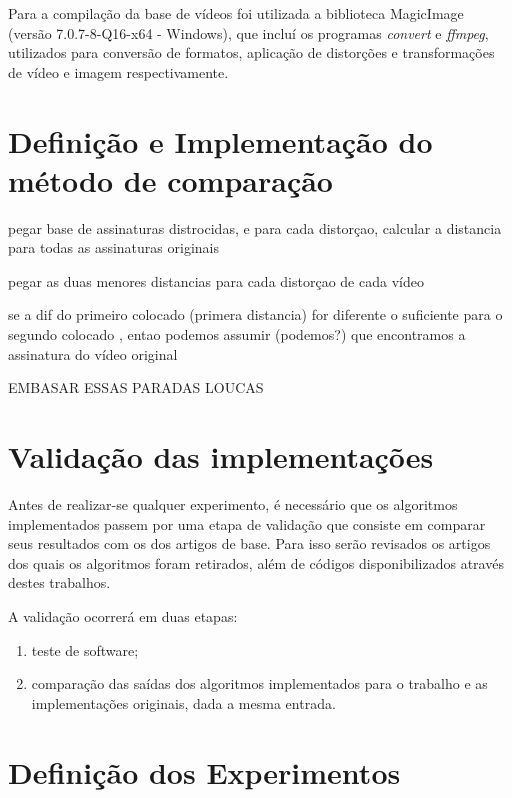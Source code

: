 Para a compilação da base de vídeos foi utilizada a biblioteca MagicImage (versão 7.0.7-8-Q16-x64 - Windows), que incluí os programas \textit{convert} e \textit{ffmpeg}, utilizados para conversão de formatos, aplicação de distorções e transformações de vídeo e imagem respectivamente.

\section{Definição e Implementação do método de comparação}




pegar base de assinaturas distrocidas, e para cada distorçao, calcular a distancia para todas as assinaturas originais

pegar as duas menores distancias para cada distorçao de cada vídeo

se a dif do primeiro colocado (primera distancia) for diferente o suficiente para o segundo colocado , entao podemos assumir (podemos?) que encontramos a assinatura do vídeo original

EMBASAR ESSAS PARADAS LOUCAS

\section{Validação das implementações}

Antes de realizar-se qualquer experimento, é necessário que os algoritmos implementados passem por uma etapa de validação que consiste em comparar seus resultados com os dos artigos de base. Para isso serão revisados os artigos dos quais os algoritmos foram retirados, além de códigos disponibilizados através destes trabalhos.

A validação ocorrerá em duas etapas:

\begin{enumerate}
\item teste de software;
\item comparação das saídas dos algoritmos implementados para o trabalho e as implementações originais, dada a mesma entrada.
\end{enumerate}

\section{Definição dos Experimentos}
\label{sec:definicaoexperimentos}